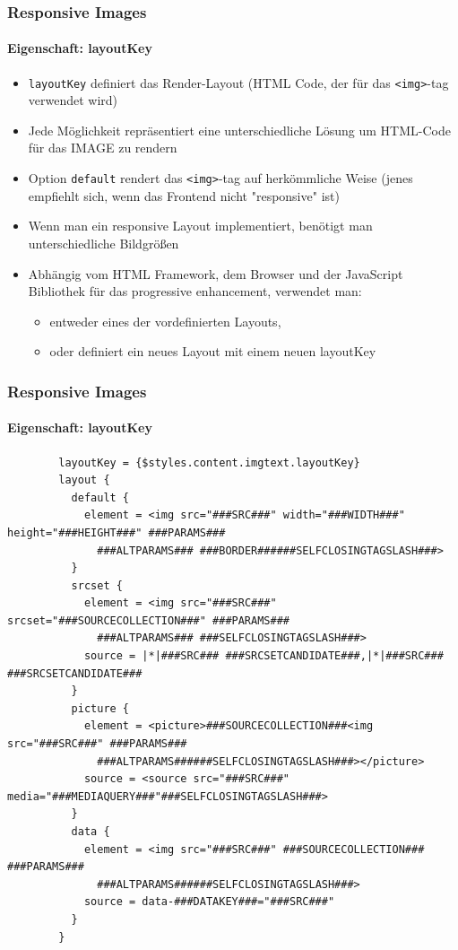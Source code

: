 \begin{frame}[fragile]
	\frametitle{Responsive Images}
	\framesubtitle{Eigenschaft: layoutKey}

	\begin{itemize}
		\item \texttt{layoutKey} definiert das Render-Layout\newline
			\small(HTML Code, der für das \texttt{<img>}-tag verwendet wird)\normalsize
		\item Jede Möglichkeit repräsentiert eine unterschiedliche Lösung um HTML-Code für das IMAGE zu rendern
		\item Option \texttt{default} rendert das \texttt{<img>}-tag auf herkömmliche Weise\newline
			\small(jenes empfiehlt sich, wenn das Frontend nicht "responsive" ist)\normalsize
		\item Wenn man ein responsive Layout implementiert, benötigt man unterschiedliche Bildgrößen
		\item Abhängig vom HTML Framework, dem Browser und der JavaScript Bibliothek für das progressive enhancement, verwendet man:

			\begin{itemize}
				\item entweder eines der vordefinierten Layouts,
				\item oder definiert ein neues Layout mit einem neuen layoutKey
			\end{itemize}

	\end{itemize}

\end{frame}


\begin{frame}[fragile]
	\frametitle{Responsive Images}
	\framesubtitle{Eigenschaft: layoutKey}

	\lstset{
		basicstyle=\tiny\ttfamily
	}

	\begin{lstlisting}
		layoutKey = {$styles.content.imgtext.layoutKey}
		layout {
		  default {
		    element = <img src="###SRC###" width="###WIDTH###" height="###HEIGHT###" ###PARAMS###
		      ###ALTPARAMS### ###BORDER######SELFCLOSINGTAGSLASH###>
		  }
		  srcset {
		    element = <img src="###SRC###" srcset="###SOURCECOLLECTION###" ###PARAMS###
		      ###ALTPARAMS### ###SELFCLOSINGTAGSLASH###>
		    source = |*|###SRC### ###SRCSETCANDIDATE###,|*|###SRC### ###SRCSETCANDIDATE###
		  }
		  picture {
		    element = <picture>###SOURCECOLLECTION###<img src="###SRC###" ###PARAMS###
		      ###ALTPARAMS######SELFCLOSINGTAGSLASH###></picture>
		    source = <source src="###SRC###" media="###MEDIAQUERY###"###SELFCLOSINGTAGSLASH###>
		  }
		  data {
		    element = <img src="###SRC###" ###SOURCECOLLECTION### ###PARAMS###
		      ###ALTPARAMS######SELFCLOSINGTAGSLASH###>
		    source = data-###DATAKEY###="###SRC###"
		  }
		}
	\end{lstlisting}

\end{frame}


